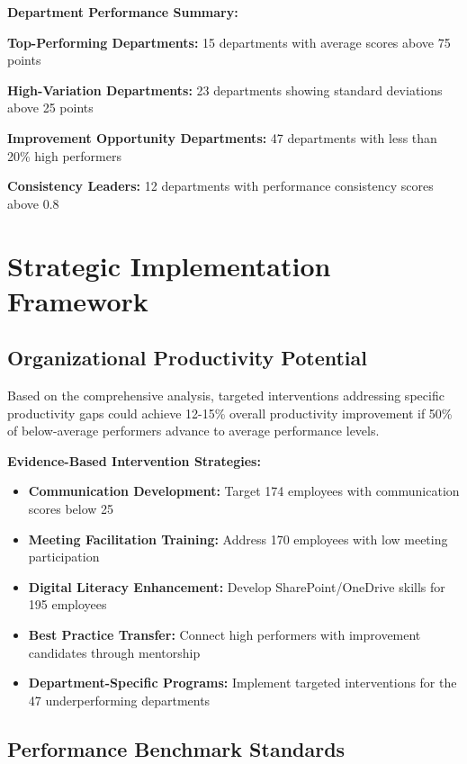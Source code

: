 \documentclass[12pt,a4paper]{article}
\begin{document}
\begin{infobox}
\textbf{\faBuilding \quad Department Performance Summary:}

\textbf{Top-Performing Departments:} 15 departments with average scores above 75 points

\textbf{High-Variation Departments:} 23 departments showing standard deviations above 25 points

\textbf{Improvement Opportunity Departments:} 47 departments with less than 20\% high performers

\textbf{Consistency Leaders:} 12 departments with performance consistency scores above 0.8
\end{infobox}

\section{Strategic Implementation Framework}

\subsection{Organizational Productivity Potential}

Based on the comprehensive analysis, targeted interventions addressing specific productivity gaps could achieve 12-15\% overall productivity improvement if 50\% of below-average performers advance to average performance levels.

\begin{highlightbox}
\textbf{\faPlay \quad Evidence-Based Intervention Strategies:}
\begin{itemize}
    \item \textbf{Communication Development:} Target 174 employees with communication scores below 25
    \item \textbf{Meeting Facilitation Training:} Address 170 employees with low meeting participation
    \item \textbf{Digital Literacy Enhancement:} Develop SharePoint/OneDrive skills for 195 employees
    \item \textbf{Best Practice Transfer:} Connect high performers with improvement candidates through mentorship
    \item \textbf{Department-Specific Programs:} Implement targeted interventions for the 47 underperforming departments
\end{itemize}
\end{highlightbox}

\subsection{Performance Benchmark Standards}
\end{document}
